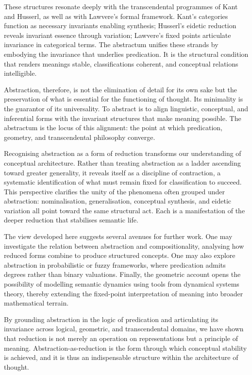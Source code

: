 \documentclass[12pt,letterpaper]{article}
\begin{document}
These structures resonate deeply with the transcendental programmes of Kant and Husserl, as well as with Lawvere’s formal framework. Kant’s categories function as necessary invariants enabling synthesis; Husserl’s eidetic reduction reveals invariant essence through variation; Lawvere’s fixed points articulate invariance in categorical terms. The abstractum unifies these strands by embodying the invariance that underlies predication. It is the structural condition that renders meanings stable, classifications coherent, and conceptual relations intelligible.

Abstraction, therefore, is not the elimination of detail for its own sake but the preservation of what is essential for the functioning of thought. Its minimality is the guarantor of its universality. To abstract is to align linguistic, conceptual, and inferential forms with the invariant structures that make meaning possible. The abstractum is the locus of this alignment: the point at which predication, geometry, and transcendental philosophy converge.

Recognising abstraction as a form of reduction transforms our understanding of conceptual architecture. Rather than treating abstraction as a ladder ascending toward greater generality, it reveals itself as a discipline of contraction, a systematic identification of what must remain fixed for classification to succeed. This perspective clarifies the unity of the phenomena often grouped under abstraction: nominalisation, generalisation, conceptual synthesis, and eidetic variation all point toward the same structural act. Each is a manifestation of the deeper reduction that stabilises semantic life.

The view developed here suggests several avenues for further work. One may investigate the relation between abstraction and compositionality, analysing how reduced forms combine to produce structured concepts. One may also explore abstraction in probabilistic or fuzzy frameworks, where predication admits degrees rather than binary valuations. Finally, the geometric account opens the possibility of modelling semantic dynamics using tools from dynamical systems theory, thereby extending the fixed-point interpretation of meaning into broader mathematical terrain.

By grounding abstraction in the logic of predication and articulating its invariance across logical, geometric, and transcendental domains, we have shown that reduction is not merely an operation on representations but a principle of meaning. Abstraction-as-reduction is the form through which conceptual stability is achieved, and it is thus an indispensable structure within the architecture of thought.

\newpage
\printbibliography
\end{document}

